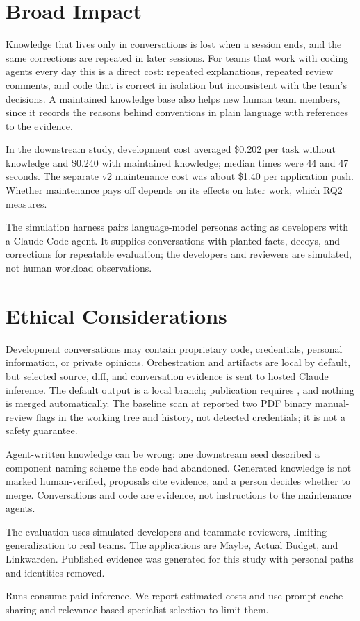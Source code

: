 \section{Broad Impact}

Knowledge that lives only in conversations is lost when a session ends, and the same corrections are repeated in later sessions. For teams that work with coding agents every day this is a direct cost: repeated explanations, repeated review comments, and code that is correct in isolation but inconsistent with the team's decisions. A maintained knowledge base also helps new human team members, since it records the reasons behind conventions in plain language with references to the evidence.

In the downstream study, development cost averaged \$0.202 per task without knowledge and \$0.240 with maintained knowledge; median times were 44 and 47 seconds. The separate v2 maintenance cost was about \$1.40 per application push. Whether maintenance pays off depends on its effects on later work, which RQ2 measures.

The simulation harness pairs language-model personas acting as developers with a Claude Code agent. It supplies conversations with planted facts, decoys, and corrections for repeatable evaluation; the developers and reviewers are simulated, not human workload observations.

\section{Ethical Considerations}

Development conversations may contain proprietary code, credentials, personal information, or private opinions. Orchestration and artifacts are local by default, but selected source, diff, and conversation evidence is sent to hosted Claude inference. The default output is a local branch; publication requires , and nothing is merged automatically. The baseline scan at  reported two PDF binary manual-review flags in the working tree and history, not detected credentials; it is not a safety guarantee.

Agent-written knowledge can be wrong: one downstream seed described a component naming scheme the code had abandoned. Generated knowledge is not marked human-verified, proposals cite evidence, and a person decides whether to merge. Conversations and code are evidence, not instructions to the maintenance agents.

The evaluation uses simulated developers and teammate reviewers, limiting generalization to real teams. The applications are Maybe, Actual Budget, and Linkwarden. Published evidence was generated for this study with personal paths and identities removed.

Runs consume paid inference. We report estimated costs and use prompt-cache sharing and relevance-based specialist selection to limit them.
